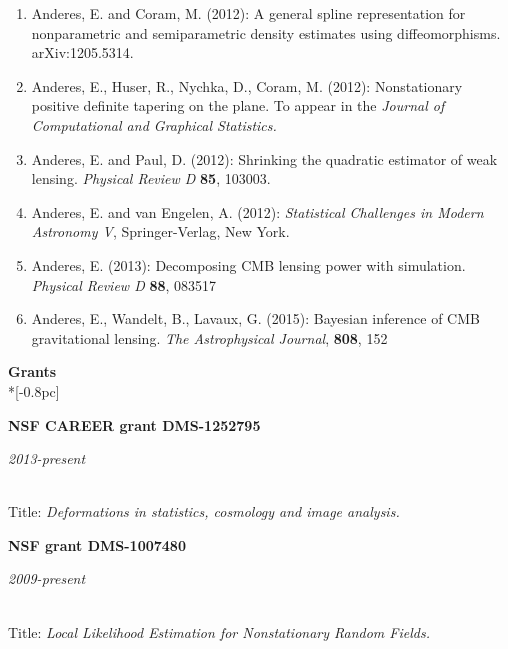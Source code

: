 \documentclass[11pt]{article}
\newcommand{\head}[1]{
  \vspace{10pt}
  {\Large \bf #1} \\*[-0.8pc]
  \underline{\hspace{6.07in}}}
\newcommand{\datedentry}[2]{
  \vspace{5pt}
  \begin{minipage}{5in}{\textbf{#1}}\end{minipage}
  \hfill
  \begin{minipage}{1in}{\hfill\textit{#2}}\end{minipage}
  }
\begin{document}
\begin{enumerate}[labelindent=0pt]
\item
Anderes, E. and Coram, M. (2012):  A general spline representation for nonparametric and semiparametric density estimates using diffeomorphisms.  arXiv:1205.5314.



\item
Anderes, E., Huser, R., Nychka, D., Coram, M. (2012): Nonstationary positive definite tapering on the plane. To appear in the \textit{Journal of Computational and Graphical Statistics.}






\item
Anderes, E. and Paul, D. (2012):  Shrinking the quadratic estimator of weak lensing.
\textit{Physical Review D} {\bf 85}, 103003.



\item
Anderes, E. and van Engelen, A. (2012):  \textit{Statistical Challenges in Modern Astronomy V}, Springer-Verlag, New York.





\item
Anderes, E. (2013):
Decomposing CMB lensing power with simulation. \\
\textit{Physical Review D} {\bf 88}, 083517


\item
Anderes, E., Wandelt, B.,  Lavaux, G. (2015): Bayesian inference of CMB gravitational lensing.
\textit{The Astrophysical Journal}, {\bf 808}, 152

 \end{enumerate}


%
%

\head{Grants}%
 \vspace{.1mm}


\datedentry{NSF CAREER grant DMS-1252795}{2013-present}\\
Title: {\sl Deformations in statistics, cosmology and image analysis.}

\vspace{7pt}

\datedentry{NSF grant DMS-1007480 }{2009-present}\\
Title: {\sl Local Likelihood Estimation for Nonstationary Random Fields.}
\end{document}
